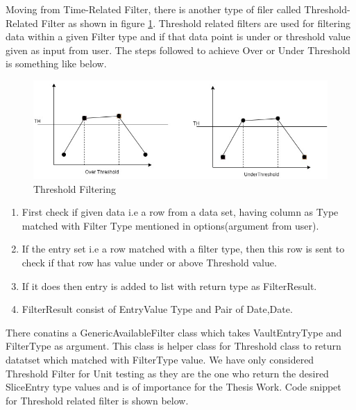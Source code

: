 \documentclass[article,type=msc,colorback,accentcolor=tud9c,twoside,11pt]{tudthesis}
\begin{document}
Moving from Time-Related Filter, there is another type of filer called Threshold-Related Filter as shown in figure \ref{fig:Threshold}. Threshold related filters are used for filtering data within a given Filter type and if that data point is under or threshold value given as input from user. The steps followed to achieve Over or Under Threshold is something like below.
\begin{figure}[h]
	\centering
	\includegraphics[scale=0.7]{Threshold.jpg}
	\caption{Threshold Filtering}
	\label{fig:Threshold}
\end{figure}

\begin{enumerate}
	\item First check if given data i.e a row from a data set, having column as Type matched with Filter Type mentioned in options(argument from user).
	\item If the entry set i.e a row matched with a filter type, then this row is sent to check if that row has value under or above Threshold value.
	\item If it does then entry is added to list with return type as FilterResult.
	\item FilterResult consist of EntryValue Type and Pair of Date,Date.
\end{enumerate}
There conatins a GenericAvailableFilter class which takes VaultEntryType and FilterType as argument. This class is helper class for Threshold class to return datatset which  matched with FilterType value. We have only considered Threshold Filter for Unit testing as they are the one who return the desired SliceEntry type values and is of importance for the Thesis Work. Code snippet for Threshold related filter is shown below.
\end{document}
